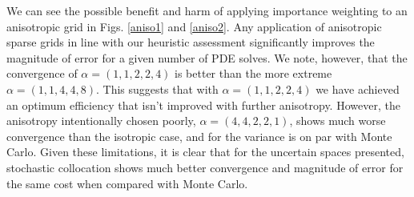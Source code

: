 \documentclass{anstrans} \usepackage{amsmath} \usepackage{amssymb}
\begin{document}
We can see the possible benefit and harm of applying importance weighting to an anisotropic grid in Figs.
\ref{aniso1} and \ref{aniso2}.  Any application of anisotropic sparse grids in line with our heuristic
assessment significantly improves the magnitude of error for a given number of PDE solves.  We note, however,
that the convergence of $\alpha=(1,1,2,2,4)$ is better than the more extreme $\alpha=(1,1,4,4,8)$.  This
suggests that with $\alpha=(1,1,2,2,4)$ we have achieved an optimum efficiency that isn't improved with
further anisotropy.  However, the anisotropy intentionally chosen poorly, $\alpha=(4,4,2,2,1)$, shows much
worse convergence than the isotropic case, and for the variance is on par with Monte Carlo.  Given these
limitations, it is clear that for the uncertain spaces presented, stochastic collocation shows much better
convergence and magnitude of error for the same cost when compared with Monte Carlo. 

%
%

{}  
\end{document}
